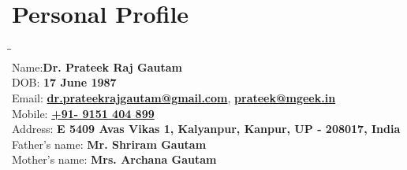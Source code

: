  \vspace{-2em}
 \section{Personal Profile}
 \vspace{-2.5em}
 \begin{tabbing}
 \=\hspace{7em}\= \kill \\
 \>Name:\>\textbf{{Dr. Prateek Raj Gautam}} \\
 \>DOB: \>\textbf{{17 June 1987}}\\ 
 \>Email: \>\textbf{{\href{mailto:dr.prateekrajgautam@gmail.com}{dr.prateekrajgautam@gmail.com}}},  \textbf{{\href{mailto:prateek@mgeek.in}{prateek@mgeek.in}}} \\
 \>Mobile: \>\textbf{{\href{https://t.me/prateekrajgautam}{+91- 9151 404 899}}}\\
 \>Address: \>\textbf{{E 540\/9 Avas Vikas 1, Kalyanpur, Kanpur, UP - 208017, India}}\\
 \>Father’s name: \>\textbf{{Mr. Shriram Gautam}} \\
 \>Mother’s name: \>\textbf{{Mrs. Archana Gautam}}
 \end{tabbing}
 \vspace{-2em}
 \sectionline
